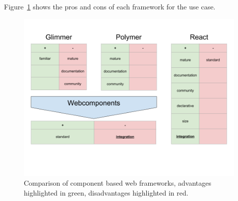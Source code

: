 Figure~\ref{fig:implementation:frontend-frameworks} shows the pros and cons of each framework for the use case.

\begin{figure}[h]
  \centering
  \includegraphics[width=\textwidth]{images/frontend-frameworks.png}
  \caption{Comparison of component based web frameworks, advantages highlighted in green, disadvantages highlighted in red.}\label{fig:implementation:frontend-frameworks}
\end{figure}

